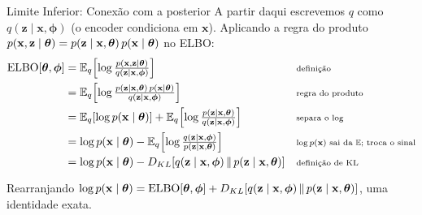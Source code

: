 \documentclass[aspectratio=169,xcolor=dvipsnames]{beamer}
\begin{document}
  \begin{frame}{Limite Inferior: Conexão com a posterior}
    \small
    A partir daqui escrevemos $q$ como $q(\mathbf{z}\mid \mathbf{x},\bm{\phi})$ (o encoder
    condiciona em $\mathbf{x}$). Aplicando a regra do produto
    $p(\mathbf{x},\mathbf{z}\mid\bm{\theta}) = p(\mathbf{z}\mid \mathbf{x},\bm{\theta})\,p(\mathbf{x}\mid\bm{\theta})$ no ELBO:
    {\small
    \begin{align*}
      \mathrm{ELBO}[\bm{\theta},\bm{\phi}]
      &= \mathbb{E}_{q}\!\left[\log\tfrac{p(\mathbf{x},\mathbf{z}\mid\bm{\theta})}{q(\mathbf{z}\mid \mathbf{x},\bm{\phi})}\right]
         && \text{\scriptsize definição} \\
      &= \mathbb{E}_{q}\!\left[\log\tfrac{p(\mathbf{z}\mid \mathbf{x},\bm{\theta})\,p(\mathbf{x}\mid\bm{\theta})}{q(\mathbf{z}\mid \mathbf{x},\bm{\phi})}\right]
         && \text{\scriptsize regra do produto} \\
      &= \mathbb{E}_{q}\!\left[\log p(\mathbf{x}\mid\bm{\theta})\right]
       + \mathbb{E}_{q}\!\left[\log\tfrac{p(\mathbf{z}\mid \mathbf{x},\bm{\theta})}{q(\mathbf{z}\mid \mathbf{x},\bm{\phi})}\right]
         && \text{\scriptsize separa o $\log$} \\
      &= \log p(\mathbf{x}\mid\bm{\theta})
       - \mathbb{E}_{q}\!\left[\log\tfrac{q(\mathbf{z}\mid \mathbf{x},\bm{\phi})}{p(\mathbf{z}\mid \mathbf{x},\bm{\theta})}\right]
         && \text{\scriptsize $\log p(\mathbf{x})$ sai da $\mathbb{E}$; troca o sinal} \\
      &= \log p(\mathbf{x}\mid\bm{\theta})
       - D_{KL}\!\left[q(\mathbf{z}\mid \mathbf{x},\bm{\phi})\,\|\,p(\mathbf{z}\mid \mathbf{x},\bm{\theta})\right]
         && \text{\scriptsize definição de KL}
    \end{align*}}
    \begin{alertblock}{Rearranjando}
      \footnotesize
      $\log p(\mathbf{x}\mid\bm{\theta}) = \mathrm{ELBO}[\bm{\theta},\bm{\phi}]
       + D_{KL}\!\left[q(\mathbf{z}\mid \mathbf{x},\bm{\phi})\,\|\,p(\mathbf{z}\mid \mathbf{x},\bm{\theta})\right]$,
      uma identidade exata.
    \end{alertblock}
  \end{frame}
\end{document}
